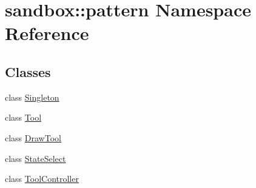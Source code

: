 \hypertarget{namespacesandbox_1_1pattern}{\section{sandbox\-:\-:pattern Namespace Reference}
\label{namespacesandbox_1_1pattern}
}
\subsection*{Classes}
\begin{DoxyCompactItemize}
\item 
class \hyperlink{classsandbox_1_1pattern_1_1_singleton}{Singleton}
\item 
class \hyperlink{classsandbox_1_1pattern_1_1_tool}{Tool}
\item 
class \hyperlink{classsandbox_1_1pattern_1_1_draw_tool}{Draw\-Tool}
\item 
class \hyperlink{classsandbox_1_1pattern_1_1_state_select}{State\-Select}
\item 
class \hyperlink{classsandbox_1_1pattern_1_1_tool_controller}{Tool\-Controller}
\end{DoxyCompactItemize}
